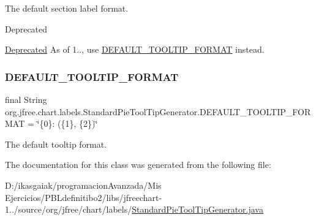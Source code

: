 The default section label format.

\begin{DoxyRefDesc}{Deprecated}
\item[\mbox{\hyperlink{deprecated__deprecated000052}{Deprecated}}]As of 1.., use \mbox{\hyperlink{classorg_1_1jfree_1_1chart_1_1labels_1_1_standard_pie_tool_tip_generator_a815aa512e809e115970498d4a1d6ea76}{D\+E\+F\+A\+U\+L\+T\+\_\+\+T\+O\+O\+L\+T\+I\+P\+\_\+\+F\+O\+R\+M\+AT}} instead. \end{DoxyRefDesc}
\mbox{\label{classorg_1_1jfree_1_1chart_1_1labels_1_1_standard_pie_tool_tip_generator_a815aa512e809e115970498d4a1d6ea76}} 
\subsubsection{\texorpdfstring{D\+E\+F\+A\+U\+L\+T\+\_\+\+T\+O\+O\+L\+T\+I\+P\+\_\+\+F\+O\+R\+M\+AT}{DEFAULT\_TOOLTIP\_FORMAT}}
{\footnotesize\ttfamily final String org.\+jfree.\+chart.\+labels.\+Standard\+Pie\+Tool\+Tip\+Generator.\+D\+E\+F\+A\+U\+L\+T\+\_\+\+T\+O\+O\+L\+T\+I\+P\+\_\+\+F\+O\+R\+M\+AT = \char`\"{}\{0\}\+: (\{1\}, \{2\})\char`\"{}\hspace{0.3cm}{\ttfamily [static]}}

The default tooltip format. 

The documentation for this class was generated from the following file\+:\begin{DoxyCompactItemize}
\item 
D\+:/ikasgaiak/programacion\+Avanzada/\+Mis Ejercicios/\+P\+B\+Ldefinitibo2/libs/jfreechart-\/1../source/org/jfree/chart/labels/\mbox{\hyperlink{_standard_pie_tool_tip_generator_8java}{Standard\+Pie\+Tool\+Tip\+Generator.\+java}}\end{DoxyCompactItemize}
